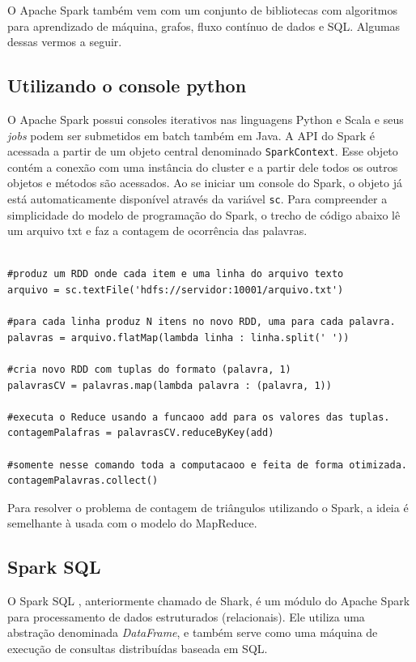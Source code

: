 O Apache Spark também vem com um conjunto de bibliotecas com algoritmos para aprendizado de máquina, 
grafos, fluxo contínuo de dados e SQL. Algumas dessas vermos a seguir.

\subsection{Utilizando o console python}
O Apache Spark possui consoles iterativos nas linguagens Python e Scala e seus \textit{jobs} podem 
ser submetidos em batch também em Java. A API do Spark é acessada a partir de um objeto central 
denominado \texttt{SparkContext}. Esse objeto contém a conexão com uma instância do cluster e a partir 
dele todos os outros objetos e métodos são acessados. Ao se iniciar um console do Spark, o objeto já 
está automaticamente disponível através da variável \texttt{sc}. Para compreender a simplicidade 
do modelo de programação do Spark, o trecho de código abaixo lê um arquivo txt e faz a contagem de 
ocorrência das palavras.

\begin{lstlisting}[style=MyPythonStyle]

#produz um RDD onde cada item e uma linha do arquivo texto
arquivo = sc.textFile('hdfs://servidor:10001/arquivo.txt') 

#para cada linha produz N itens no novo RDD, uma para cada palavra.
palavras = arquivo.flatMap(lambda linha : linha.split(' ')) 

#cria novo RDD com tuplas do formato (palavra, 1)
palavrasCV = palavras.map(lambda palavra : (palavra, 1)) 

#executa o Reduce usando a funcaoo add para os valores das tuplas.
contagemPalafras = palavrasCV.reduceByKey(add) 

#somente nesse comando toda a computacaoo e feita de forma otimizada.
contagemPalavras.collect() 

\end{lstlisting}

Para resolver o problema de contagem de triângulos utilizando o Spark, a ideia é semelhante à usada com 
o modelo do MapReduce.

\subsection{Spark SQL}
O Spark SQL \cite{xin2013shark, armbrust2015spark}, anteriormente chamado de Shark, é um módulo do Apache 
Spark para processamento de dados estruturados (relacionais). Ele utiliza uma abstração denominada 
\emph{DataFrame}, e também serve como uma máquina de execução de consultas distribuídas baseada em SQL. 

